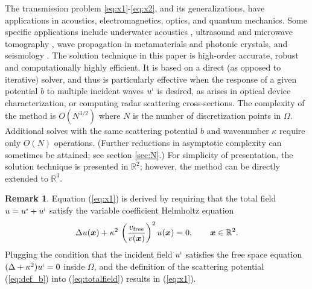 \documentclass[11pt,final]{amsart}
\theoremstyle{definition}
\newtheorem{remark}{Remark}
\numberwithin{remark}{section}
\numberwithin{definition}{section}
\numberwithin{pro}{section}
\begin{document}
The transmission problem \eqref{eq:x1}-\eqref{eq:x2}, and its generalizations,
have applications in acoustics, electromagnetics, optics, and quantum mechanics.
Some specific applications include underwater acoustics \cite{underwater},
ultrasound and microwave tomography \cite{3dmicrowave,wadbro10},
wave propagation in metamaterials and photonic crystals, and seismology \cite{seismic3D}.
The solution technique in this paper is high-order accurate, robust and computationally highly efficient.
It is based on a direct (as opposed to iterative) solver, and thus is particularly effective
when the response of a given potential $b$ to multiple incident waves $u^{\mbox{\tiny i}}$ is desired,
as arises in optical device characterization, or computing radar scattering
cross-sections.
The complexity of the method is
$O(N^{3/2})$ where $N$ is the number of discretization points in $\Omega$.
Additional solves with the same scattering potential $b$ and wavenumber $\kappa$
require only $O(N)$
operations. (Further reductions in asymptotic complexity can sometimes be attained; see section \ref{sec:N}.)
For simplicity of presentation, the solution technique is presented in $\mathbb{R}^2$; however, the method
can be directly extended to $\mathbb{R}^3$.

\begin{remark}
Equation (\ref{eq:x1}) is derived by requiring that the total field $u = u^{\mbox{\tiny s}} + u^{\mbox{\tiny i}}$ satisfy
the variable coefficient Helmholtz equation
\begin{equation}
\label{eq:totalfield}
\Delta u(\bm{x}) + \kappa^{2}\,\left(\frac{v_{\rm free}}{v(\bm{x})}\right)^{2}u(\bm{x}) = 0,\qquad \bm{x} \in \mathbb{R}^{2}.
\end{equation}
Plugging the condition that the incident field $u^{\mbox{\tiny i}}$ satisfies the free space equation
 $(\Delta + \kappa^{2})u^{\mbox{\tiny i}} = 0$ inside $\Omega$, and the definition
of the scattering potential (\ref{eq:def_b}) into (\ref{eq:totalfield}) results in (\ref{eq:x1}).
\end{remark}
\end{document}
